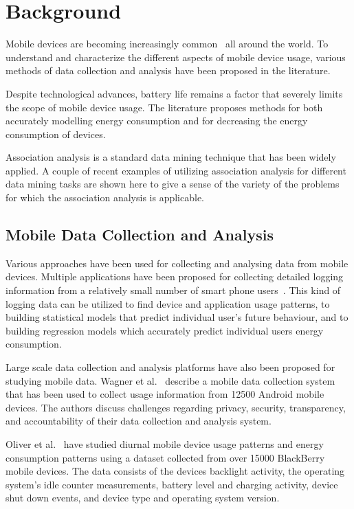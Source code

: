 \section{Background}

Mobile devices are becoming increasingly common~\cite{ITUstats} all around the world. To understand and characterize the different aspects of mobile device usage, various methods of data collection and analysis have been proposed in the literature. 

Despite technological advances, battery life remains a factor that severely limits the scope of mobile device usage. The literature proposes methods for both accurately modelling energy consumption and for decreasing the energy consumption of devices.             

Association analysis is a standard data mining technique that has been widely applied. A couple of recent examples of utilizing association analysis for different data mining tasks are shown here to give a sense of the variety of the problems for which the association analysis is applicable. 

\subsection{Mobile Data Collection and Analysis}

Various approaches have been used for collecting and analysing data from mobile devices. Multiple applications have been proposed for collecting detailed logging information from a relatively small number of smart phone users~\cite{Ferreira:2014:CES:2628363.2628367, Falaki:2010:DSU:1814433.1814453, 5375354}. This kind of logging data can be utilized to find device and application usage patterns, to building statistical models that predict individual user's future behaviour, and to building regression models which accurately predict individual users energy consumption. 

Large scale data collection and analysis platforms have also been proposed for studying mobile data. Wagner et al.~\cite{Wagner:2014:DAL:2627534.2627553} describe a mobile data collection system that has been used to collect usage information from 12500 Android mobile devices. The authors discuss challenges regarding privacy, security, transparency, and accountability of their data collection and analysis system. 

Oliver et al.~\cite{Oliver:2010:CLS:1834616.1834623, Oliver_datadriven} have studied diurnal mobile device usage patterns and energy consumption patterns using a dataset collected from over 15000 BlackBerry mobile devices. The data consists of the devices backlight activity, the operating system's idle counter measurements, battery level and charging activity, device shut down events, and device type and operating system version.      

